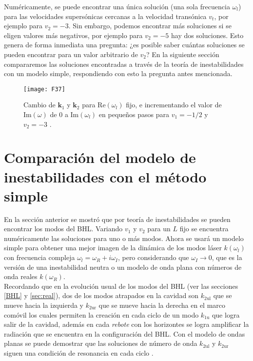 Num\'{e}ricamente, se puede encontrar 
una \'{u}nica soluci\'{o}n (una sola frecuencia $\omega_l$) para las velocidades supersónicas cercanas a la velocidad trans\'{o}nica $v_t$, por ejemplo para $v_2=-3$. 
Sin embargo, podemos encontrar m\'{a}s soluciones si se eligen valores m\'{a}s negativos, por ejemplo para $v_2=-5$ hay dos soluciones. Esto genera de forma inmediata una pregunta: ¿es posible saber cu\'{a}ntas soluciones se pueden encontrar para un valor arbitrario de $v_2$? En la siguiente sección compararemos las soluciones encontradas a través de la teoría de
inestabilidades con un modelo simple, respondiendo con esto la pregunta antes mencionada.

\begin{figure}\centering
	\texttt{[image: F37]}
	\caption{Cambio de $\textbf{k}_1$ y $\textbf{k}_2$ para $\text{Re}(\omega_l)$ fijo, e incrementando el valor de $\text{Im}(\omega)$ de $0$ a $\text{Im}(\omega_l)$ en peque\~{n}os pasos para $v_1=-1/2$ y $v_2=-3$ \citep{2018Bermudez}.}\label{fig:3.8}
\end{figure}

\section{Comparaci\'{o}n del modelo de inestabilidades con el m\'{e}todo simple}
En la secci\'{o}n anterior se mostr\'{o} que por teor\'{i}a de inestabilidades se pueden encontrar los modos del BHL. Variando $v_1$ y $v_2$ para un $L$ fijo se encuentra num\'{e}ricamente las soluciones para uno o m\'{a}s modos. Ahora se usar\'{a} un modelo simple para obtener una mejor imagen de la dinámica de los modos láser $k(\omega_l)$ con frecuencia compleja $\omega_l=\omega_R+i\omega_I$, pero considerando que $\omega_I\rightarrow 0$, que es la versi\'{o}n de una inestabilidad neutra o un modelo de onda plana con números de onda reales $k(\omega_R)$.\\

Recordando que en la evoluci\'{o}n usual de los modos del BHL (ver las secciones \ref{BHL} y  \ref{sec:real}), dos de los modos atrapados en la cavidad son $k_{\text{2ul}}$ que se mueve hacia la izquierda y $k_{\text{2ur}}$ que se mueve hacia la derecha en el marco com\'{o}vil los cuales permiten la creaci\'{o}n en cada ciclo de un modo $k_{\text{1u}}$ que logra salir de la cavidad, adem\'{a}s en cada \textit{rebote} con los horizontes se logra amplificar la radiaci\'{o}n que se encuentra en la configuraci\'{o}n del BHL. Con el modelo de ondas planas se puede demostrar que las soluciones de número de onda $k_{\text{2ul}}$ y  $k_{\text{2ur}}$ siguen una condición de resonancia en cada ciclo \citep{Leonhardt2007}.


